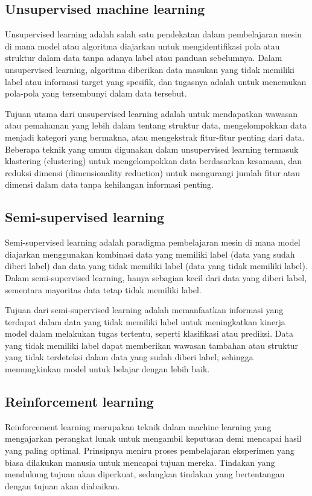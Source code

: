 \subsection{Unsupervised machine learning}
Unsupervised learning adalah salah satu pendekatan dalam pembelajaran mesin di mana model atau algoritma diajarkan untuk mengidentifikasi pola atau struktur dalam data tanpa adanya label atau panduan sebelumnya. Dalam unsupervised learning, algoritma diberikan data masukan yang tidak memiliki label atau informasi target yang spesifik, dan tugasnya adalah untuk menemukan pola-pola yang tersembunyi dalam data tersebut.

Tujuan utama dari unsupervised learning adalah untuk mendapatkan wawasan atau pemahaman yang lebih dalam tentang struktur data, mengelompokkan data menjadi kategori yang bermakna, atau mengekstrak fitur-fitur penting dari data. Beberapa teknik yang umum digunakan dalam unsupervised learning termasuk klastering (clustering) untuk mengelompokkan data berdasarkan kesamaan, dan reduksi dimensi (dimensionality reduction) untuk mengurangi jumlah fitur atau dimensi dalam data tanpa kehilangan informasi penting.

\subsection{Semi-supervised learning}
Semi-supervised learning adalah paradigma pembelajaran mesin di mana model diajarkan menggunakan kombinasi data yang memiliki label (data yang sudah diberi label) dan data yang tidak memiliki label (data yang tidak memiliki label). Dalam semi-supervised learning, hanya sebagian kecil dari data yang diberi label, sementara mayoritas data tetap tidak memiliki label.

Tujuan dari semi-supervised learning adalah memanfaatkan informasi yang terdapat dalam data yang tidak memiliki label untuk meningkatkan kinerja model dalam melakukan tugas tertentu, seperti klasifikasi atau prediksi. Data yang tidak memiliki label dapat memberikan wawasan tambahan atau struktur yang tidak terdeteksi dalam data yang sudah diberi label, sehingga memungkinkan model untuk belajar dengan lebih baik.

\subsection{Reinforcement learning}
Reinforcement learning merupakan teknik dalam machine learning yang mengajarkan perangkat lunak untuk mengambil keputusan demi mencapai hasil yang paling optimal. Prinsipnya meniru proses pembelajaran eksperimen yang biasa dilakukan manusia untuk mencapai tujuan mereka. Tindakan yang mendukung tujuan akan diperkuat, sedangkan tindakan yang bertentangan dengan tujuan akan diabaikan.

